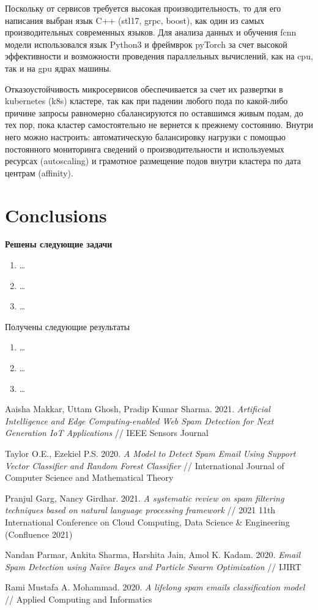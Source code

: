 \documentclass[12pt]{article}
\begin{document}
Поскольку от сервисов требуется высокая производительность, то для его написания выбран язык C++ (stl17, grpc, boost), как один из самых производительных современных языков. Для анализа данных и обучения fcnn модели использовался язык Python3 и фреймврок pyTorch за счет высокой эффективности и возможности проведения параллельных вычислений, как на cpu, так и на gpu ядрах машины.

Отказоустойчивость микросервисов обеспечивается за счет их развертки в kubernetes (k8s) кластере, так как при падении любого пода по какой-либо причине запросы равномерно сбалансируются по оставшимся живым подам, до тех пор, пока кластер самостоятельно не вернется к прежнему состоянию. Внутри него можно настроить: автоматическую балансировку нагрузки с помощью постоянного мониторинга сведений о производительности и используемых ресурсах (autoscaling) и грамотное размещение подов внутри кластера по дата центрам (affinity).


\section{Conclusions}
{
\bf\color{amaranth}
Решены следующие задачи
\begin{enumerate}
	\item \ldots
	\item \ldots
	\item \ldots
\end{enumerate}

Получены следующие результаты
\begin{enumerate}
\item \ldots
\item \ldots
\item \ldots
\end{enumerate}
}

\begin{thebibliography}{99}
Aaisha Makkar, Uttam Ghosh, Pradip Kumar Sharma.
2021. \emph{Artificial Intelligence and Edge Computing-enabled
	Web Spam Detection for Next Generation IoT
	Applications} // IEEE Sensors Journal

Taylor O.E., Ezekiel P.S.
2020. \emph{A Model to Detect Spam Email Using Support Vector Classifier and Random Forest Classifier} //
International Journal of Computer Science and Mathematical Theory

Pranjul Garg, Nancy Girdhar.
2021. \emph{A systematic review on spam filtering techniques based on
natural language processing framework} // 2021 11th International Conference on Cloud Computing, Data Science \& Engineering (Confluence 2021)

Nandan Parmar, Ankita Sharma, Harshita Jain, Amol K. Kadam.
2020. \emph{Email Spam Detection using Naïve Bayes and Particle Swarm Optimization} // IJIRT

Rami Mustafa A. Mohammad.
2020. \emph{A lifelong spam emails 	classification model} //
Applied Computing and Informatics
\end{thebibliography}
\end{document}
